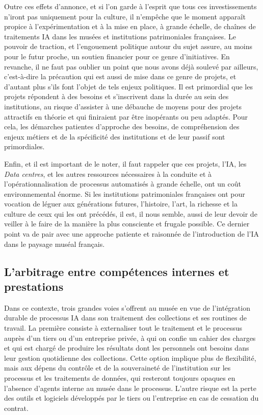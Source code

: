 Outre ces effets d'annonce, et si l'on garde à l'esprit que tous ces investissements n'iront pas uniquement pour la culture, il n'empêche que le moment apparaît propice à l'expérimentation et à la mise en place, à grande échelle, de chaînes de traitements IA dans les musées et institutions patrimoniales françaises. Le pouvoir de traction, et l'engouement politique autour du sujet assure, au moins pour le futur proche, un soutien financier pour ce genre d'initiatives. En revanche, il ne faut pas oublier un point que nous avons déjà soulevé par ailleurs, c'est-à-dire la précaution qui est aussi de mise dans ce genre de projets, et d'autant plus s'ils font l’objet de tels enjeux politiques. Il est primordial que les projets répondent à des besoins et s'inscrivent dans la durée au sein des institutions, au risque d'assister à une débauche de moyens pour des projets attractifs en théorie et qui finiraient par être inopérants ou peu adaptés. Pour cela, les démarches patientes d'approche des besoins, de compréhension des enjeux métiers et de la spécificité des institutions et de leur passif sont primordiales. 

Enfin, et il est important de le noter, il faut rappeler que ces projets, l'IA, les \textit{Data centres}, et les autres ressources nécessaires à la conduite et à l'opérationnalisation de processus automatisés à grande échelle, ont un coût environnemental énorme. Si les institutions patrimoniales françaises ont pour vocation de léguer aux générations futures, l'histoire, l'art, la richesse et la culture de ceux qui les ont précédés, il est, il nous semble, aussi de leur devoir de veiller à le faire de la manière la plus consciente et frugale possible. Ce dernier point va de pair avec une approche patiente et raisonnée de l'introduction de l'IA dans le paysage muséal français.

\subsection{L'arbitrage entre compétences internes et prestations}

Dans ce contexte, trois grandes voies s'offrent au musée en vue de l'intégration durable de processus IA dans son traitement des collections et ses routines de travail. La première consiste à externaliser tout le traitement et le processus auprès d'un tiers ou d'un entreprise privée, à qui on confie un cahier des charges et qui est chargé de produire les résultats dont les personnels ont besoins dans leur gestion quotidienne des collections. Cette option implique plus de flexibilité, mais aux dépens du contrôle et de la souveraineté de l'institution sur les processus et les traitements de données, qui resteront toujours opaques en l'absence d'agents interne au musée dans le processus. L'autre risque est la perte des outils et logiciels développés par le tiers ou l'entreprise en cas de cessation du contrat.

